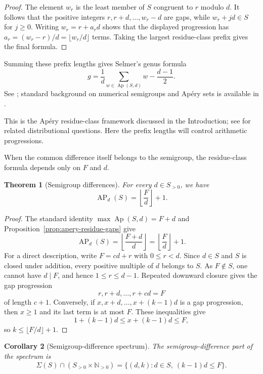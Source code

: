 \documentclass[11pt]{article}
\theoremstyle{plain}
\newtheorem{theorem}{Theorem}[section]
\newtheorem{corollary}[theorem]{Corollary}
\theoremstyle{definition}
\theoremstyle{remark}
\newcommand{\N}{\mathbb N}
\newcommand{\Ap}{\operatorname{Ap}}
\newcommand{\AP}{\operatorname{AP}}
\begin{document}
\begin{proof}
The element $w_r$ is the least member of $S$ congruent to $r$ modulo $d$.
It follows that the positive integers $r,r+d,\ldots,w_r-d$ are gaps, while
$w_r+jd\in S$ for $j\geq0$.  Writing $w_r=r+a_r d$ shows that the displayed
progression has $a_r=(w_r-r)/d=\lfloor w_r/d\rfloor$ terms.  Taking the
largest residue-class prefix gives the final formula.
\end{proof}

Summing these prefix lengths gives Selmer's genus formula
\begin{equation}\label{eq:selmer-genus}
  g=\frac1d\sum_{w\in\Ap(S,d)}w-\frac{d-1}{2}.
\end{equation}
See \cite{selmer1977}; standard background on numerical semigroups and
Ap\'ery sets is available in \cite{rosales-garcia-sanchez}.

This is the Ap\'ery residue-class framework discussed in the Introduction;
see \cite{shor-equidistribution,shor-parity} for related distributional
questions.  Here the prefix lengths will control arithmetic progressions.

When the common difference itself belongs to the semigroup, the
residue-class formula depends only on $F$ and $d$.

\begin{theorem}[Semigroup differences]\label{thm:semigroup-difference}
For every $d\in S_{>0}$, we have
\[
  \boxed{\AP_d(S)=\left\lfloor\frac Fd\right\rfloor+1.}
\]
\end{theorem}

\begin{proof}
The standard identity $\max\Ap(S,d)=F+d$ and
Proposition~\ref{prop:apery-residue-gaps} give
\[
  \AP_d(S)=\left\lfloor\frac{F+d}{d}\right\rfloor
  =\left\lfloor\frac Fd\right\rfloor+1.
\]
For a direct description, write $F=cd+r$ with $0\leq r<d$.  Since $d\in S$
and $S$ is closed under addition, every positive multiple of $d$ belongs to
$S$.  As $F\notin S$, one cannot have $d\mid F$, and hence
$1\leq r\leq d-1$.
Repeated downward closure gives the gap progression
\[
  r,r+d,\ldots,r+cd=F
\]
of length $c+1$.  Conversely, if
$x,x+d,\ldots,x+(k-1)d$ is a gap progression, then $x\geq1$ and its last
term is at most $F$.  These inequalities give
\[
  1+(k-1)d\leq x+(k-1)d\leq F,
\]
so $k\leq\lfloor F/d\rfloor+1$.
\end{proof}

\begin{corollary}[Semigroup-difference spectrum]\label{cor:s-spectrum}
The semigroup-difference part of the spectrum is
\[
  \Sigma(S)\cap(S_{>0}\times\N_{>0})
  =\{(d,k):d\in S,\ (k-1)d\leq F\}.
\]
\end{corollary}
\end{document}
